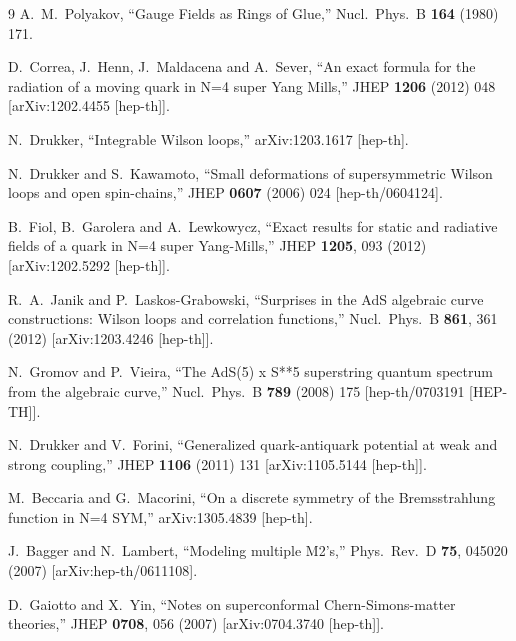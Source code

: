 \documentclass[a4paper,11pt]{article}
\numberwithin{equation}{section}
\begin{document}
\begin{thebibliography} {9}
  A.~M.~Polyakov,
  ``Gauge Fields as Rings of Glue,''
  Nucl.\ Phys.\ B {\bf 164} (1980) 171.

  D.~Correa, J.~Henn, J.~Maldacena and A.~Sever,
  ``An exact formula for the radiation of a moving quark in N=4 super Yang Mills,''
  JHEP {\bf 1206} (2012) 048
  [arXiv:1202.4455 [hep-th]].

  N.~Drukker,
  ``Integrable Wilson loops,''
  arXiv:1203.1617 [hep-th].

  N.~Drukker and S.~Kawamoto,
  ``Small deformations of supersymmetric Wilson loops and open spin-chains,''
  JHEP {\bf 0607} (2006) 024
  [hep-th/0604124].

  B.~Fiol, B.~Garolera and A.~Lewkowycz,
  ``Exact results for static and radiative fields of a quark in N=4 super Yang-Mills,''
  JHEP {\bf 1205}, 093 (2012)
  [arXiv:1202.5292 [hep-th]].

  R.~A.~Janik and P.~Laskos-Grabowski,
  ``Surprises in the AdS algebraic curve constructions: Wilson loops and correlation functions,''
  Nucl.\ Phys.\ B {\bf 861}, 361 (2012)
  [arXiv:1203.4246 [hep-th]].

  N.~Gromov and P.~Vieira,
  ``The AdS(5) x S**5 superstring quantum spectrum from the algebraic curve,''
  Nucl.\ Phys.\ B {\bf 789} (2008) 175
  [hep-th/0703191 [HEP-TH]].

  N.~Drukker and V.~Forini,
  ``Generalized quark-antiquark potential at weak and strong coupling,''
  JHEP {\bf 1106} (2011) 131
  [arXiv:1105.5144 [hep-th]].

  M.~Beccaria and G.~Macorini,
  ``On a discrete symmetry of the Bremsstrahlung function in N=4 SYM,''
  arXiv:1305.4839 [hep-th].

  J.~Bagger and N.~Lambert,
  ``Modeling multiple M2's,''
  Phys.\ Rev.\  D {\bf 75}, 045020 (2007)
  [arXiv:hep-th/0611108].

D.~Gaiotto and X.~Yin,
  ``Notes on superconformal Chern-Simons-matter theories,''
  JHEP {\bf 0708}, 056 (2007)
  [arXiv:0704.3740 [hep-th]]. 


\end{thebibliography}
\end{document}
